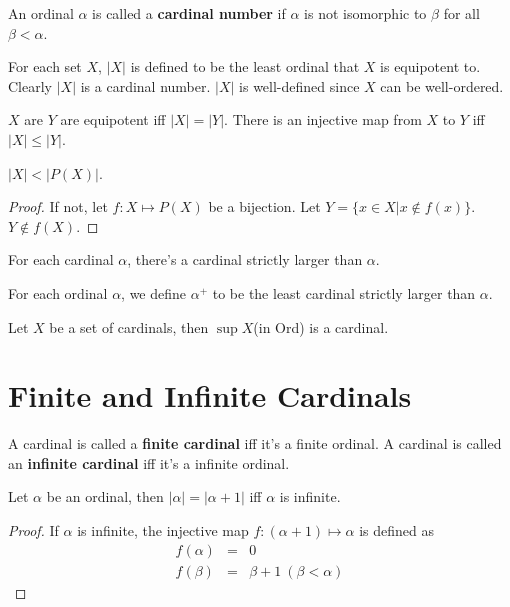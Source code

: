 \documentclass[12pt]{book}
\begin{document}
\begin{definition}
	An ordinal $\alpha$ is called a {\bf cardinal number} if $\alpha$ is not isomorphic to $\beta$ for all $\beta<\alpha$.
\end{definition}

\begin{definition}
	For each set $X$, $|X|$ is defined to be the least ordinal that $X$ is equipotent to. Clearly $|X|$ is a cardinal number. $|X|$ is well-defined since $X$ can be well-ordered.
\end{definition}
\begin{lemma}
	$X$ are $Y$ are equipotent iff $|X|=|Y|$. There is an injective map from $X$ to $Y$ iff $|X|\leq|Y|$.
\end{lemma}

\begin{lemma}
	$|X|<|P(X)|$.
\end{lemma}
\begin{proof}
	If not, let $f:X\mapsto P(X)$ be a bijection. Let $Y=\{x\in X|x\not\in f(x)\}$. $Y\not\in f(X)$.
\end{proof}

\begin{lemma}
	For each cardinal $\alpha$, there's a cardinal strictly larger than $\alpha$.
\end{lemma}

\begin{definition}
	For each ordinal $\alpha$, we define $\alpha^+$ to be the least cardinal strictly larger than $\alpha$.
\end{definition}

\begin{lemma}
	Let $X$ be a set of cardinals, then $\sup X$(in Ord) is a cardinal.
\end{lemma}

\section{Finite and Infinite Cardinals}

\begin{definition}
	A cardinal is called a {\bf finite cardinal} iff it's a finite ordinal. A cardinal is called an {\bf infinite cardinal} iff it's a infinite ordinal.
\end{definition}

\begin{lemma}
	Let $\alpha$ be an ordinal, then $|\alpha|=|\alpha+1|$ iff $\alpha$ is infinite.
\end{lemma}
\begin{proof}
	If $\alpha$ is infinite, the injective map $f:(\alpha+1)\mapsto\alpha$ is defined as
	\begin{eqnarray}
		f(\alpha)&=&0\\
		f(\beta)&=&\beta+1\ (\beta<\alpha)
	\end{eqnarray}
\end{proof}
\end{document}
